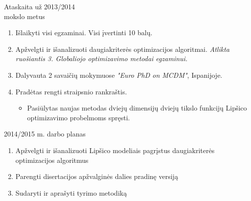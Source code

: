 \documentclass{beamer}
\begin{document}
\begin{frame}[fragile]{\LARGE Ataskaita už 2013/2014 \\ mokslo metus}
    \begin{enumerate}
        \item Išlaikyti visi egzaminai. Visi įvertinti 10 balų.
        \smallskip
        \item Apžvelgti ir išanalizuoti daugiakriterės optimizacijos
            algoritmai. \footnotesize \textit{Atlikta ruošiantis 3. Globaliojo optimizavimo metodai egzaminui.} \normalsize
        \item Dalyvauta 2 savaičių mokymuose \textit{"Euro PhD on MCDM"}, Ispanijoje.
        \smallskip
        \item Pradėtas rengti straipsnio rankraštis. \\
            \begin{itemize}
        \footnotesize \item Pasiūlytas naujas metodas dviejų dimensijų dviejų tikslo funkcijų Lipšico
            optimizavimo probelmoms spręsti.\normalsize
        \end{itemize}
    \end{enumerate}
\end{frame}

\begin{frame}{2014/2015 m. darbo planas}
    \begin{enumerate}
        \item Apžvelgti ir išanalizuoti Lipšico modeliais pagrįstus
            daugiakriterės optimizacijos algoritmus
        \item Parengti disertacijos apžvalginės dalies pradinę versiją
        \item Sudaryti ir aprašyti tyrimo metodiką
    \end{enumerate}
\end{frame}
\end{document}
